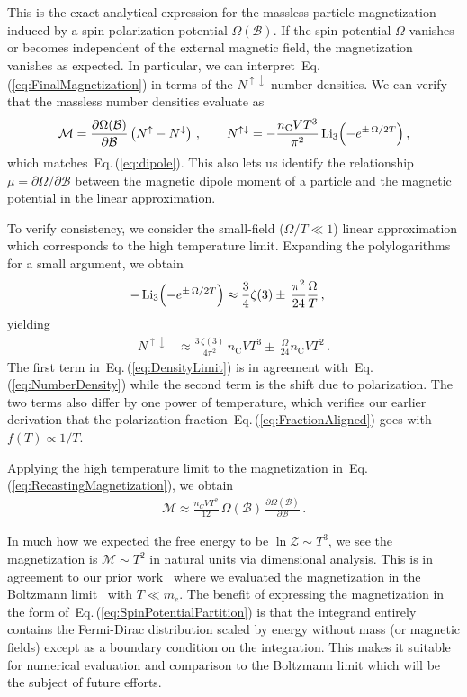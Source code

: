 \documentclass[epjST]{svjour}
\newcommand{\req}[1]{Eq.\,(\ref{#1})}
\begin{document}
{This is the exact analytical expression for the massless particle magnetization induced by a spin polarization potential \(\Omega(\mathcal{B})\). If the spin potential \(\Omega\) vanishes or becomes independent of the external magnetic field, the magnetization vanishes as expected. In particular, we can interpret~\req{eq:FinalMagnetization} in terms of the \(N^{\uparrow\downarrow}\) number densities. We can verify that the massless number densities evaluate as
\begin{equation}
 \label{eq:RecastingMagnetization}
 \mathcal{M} = \frac{\partial\Omega(\mathcal{B})}{\partial\mathcal{B}}\left(N^{\uparrow}-N^{\downarrow}\right)\,,\qquad
 N^{\uparrow\downarrow} = -\frac{n_{\mathrm{C}}VT^3}{\pi^2}\operatorname{Li}_3\Bigl(-e^{\pm\,\Omega/2T}\Bigr)\,,
\end{equation}
which matches~\req{eq:dipole}. This also lets us identify the relationship \(\mu=\partial\Omega/\partial\mathcal{B}\) between the magnetic dipole moment of a particle and the magnetic potential in the linear approximation.

To verify consistency, we consider the small-field (\(\Omega/T\ll 1\)) linear approximation which corresponds to the high temperature limit. Expanding the polylogarithms for a small argument, we obtain
\begin{align}
 -\operatorname{Li}_3\Bigl(-e^{\pm\,\Omega/2T}\Bigr) &\approx \frac{3}{4}\zeta(3) \pm\,\frac{\pi^2}{24}\frac{\Omega}{T}\,,
\end{align}
yielding
\begin{align}
 \label{eq:DensityLimit}
 N^{\uparrow\downarrow} &\approx \frac{3\,\zeta(3)}{4\pi^2}\,n_{\mathrm{C}}VT^3 \pm\,\frac{\Omega}{24}n_{\mathrm{C}}VT^2\,.
\end{align}
The first term in~\req{eq:DensityLimit} is in agreement with~\req{eq:NumberDensity} while the second term is the shift due to polarization. The two terms also differ by one power of temperature, which verifies our earlier derivation that the polarization fraction~\req{eq:FractionAligned} goes with \(f(T)\propto1/T\).

Applying the high temperature limit to the magnetization in~\req{eq:RecastingMagnetization}, we obtain
\begin{align}
\label{eq:FinalMag}
\mathcal{M}\approx\frac{n_C V T^2}{12}\,\Omega(\mathcal{B})\,\frac{\partial\Omega(\mathcal{B})}{\partial\mathcal{B}}\,.
\end{align}
}In much how we expected the free energy to be \(\ln\mathcal{Z}\sim T^{3}\), we see the magnetization is \(\mathcal{M}\sim T^{2}\) in natural units via dimensional analysis. This is in agreement to our prior work~\cite{Steinmetz:2023nsc,Steinmetz:2023ucp} where we evaluated the magnetization in the Boltzmann limit~\cite{Steinmetz:2023nsc} with \(T\ll m_e\). The benefit of expressing the magnetization in the form of~\req{eq:SpinPotentialPartition} is that the integrand entirely contains the Fermi-Dirac distribution scaled by energy without mass (or magnetic fields) except as a boundary condition on the integration. This makes it suitable for numerical evaluation and comparison to the Boltzmann limit which will be the subject of future efforts.
\end{document}
